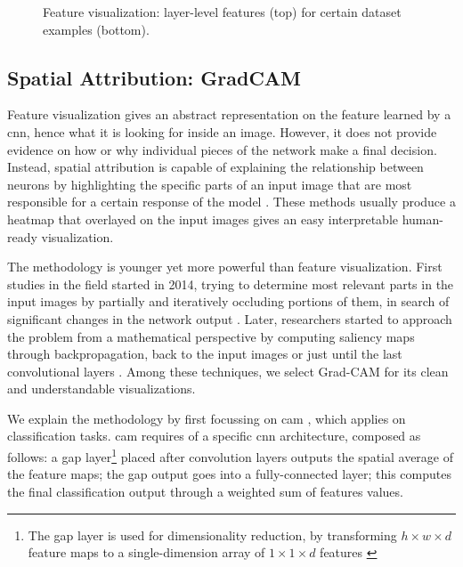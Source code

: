 \begin{figure}[!htb]
\begin{center}
\begin{subfigure}[h]{0.23\textwidth}
		\end{subfigure}
	\end{center}
	\vspace{-0.5cm}
	\caption[Feature visualization: layer-level features for certain dataset example]{Feature visualization: layer-level features (top) for certain dataset examples (bottom).}
	\label{fig:feature-visual-1}
\end{figure}



\subsection{Spatial Attribution: GradCAM}
\label{subsec:gradcam-theory}

Feature visualization gives an abstract representation on the feature learned by a \gls{cnn}, hence what it is looking for inside an image. However, it does not provide evidence on how or why individual pieces of the network make a final decision. Instead, spatial attribution is capable of explaining the relationship between neurons by highlighting the specific parts of an input image that are most responsible for a certain response of the model \cite{olah2018the}. These methods usually produce a heatmap that overlayed on the input images gives an easy interpretable human-ready visualization.

The methodology is younger yet more powerful than feature visualization. First studies in the field started in 2014, trying to determine most relevant parts in the input images by partially and iteratively occluding portions of them, in search of significant changes in the network output \cite{zeiler2013visualizing}. Later, researchers started to approach the problem from a mathematical perspective by computing saliency maps through backpropagation, back to the input images \cite{simonyan2014deep} or just until the last convolutional layers \cite{zhou2015learning}. Among these techniques, we select Grad-CAM \cite{Selvaraju_2019} for its clean and understandable visualizations.

\medskip

We explain the methodology by first focussing on \gls{cam} \cite{zhou2015learning}, which applies on classification tasks. \gls{cam} requires of a specific \gls{cnn} architecture, composed as follows: a \gls{gap} layer\footnote{The \gls{gap} layer is used for dimensionality reduction, by transforming $h \times w \times d$ feature maps to a single-dimension array of $1 \times 1 \times d$ features \cite{gap_layers}} placed after convolution layers outputs the spatial average of the feature maps; the \gls{gap} output goes into a fully-connected layer; this computes the final classification output through a weighted sum of features values.

